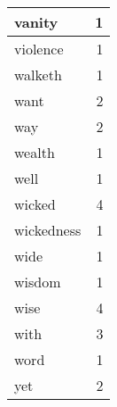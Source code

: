 \begin{center}
\begin{longtable}{l|r}
vanity & 1\\ \hline 
violence & 1\\ \hline 
walketh & 1\\ \hline 
want & 2\\ \hline 
way & 2\\ \hline 
wealth & 1\\ \hline 
well & 1\\ \hline 
wicked & 4\\ \hline 
wickedness & 1\\ \hline 
wide & 1\\ \hline 
wisdom & 1\\ \hline 
wise & 4\\ \hline 
with & 3\\ \hline 
word & 1\\ \hline 
yet & 2\\ \hline 
\end{longtable}  
\end{center}  


  
\normalsize  

  
  
